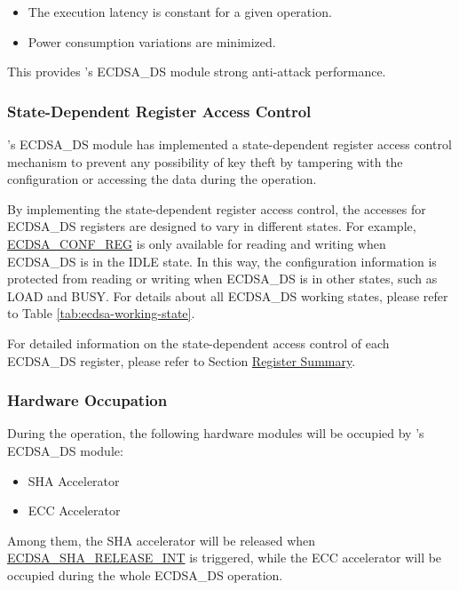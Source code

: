 \documentclass[main\_\_EN.tex]{subfiles}
\begin{document}
\begin{itemize}
    \item The execution latency is constant for a given operation.
    \item Power consumption variations are minimized.
\end{itemize}

This provides \chipseries{}'s ECDSA\_DS module strong anti-attack performance.

\subsubsection{State-Dependent Register Access Control}

\chipseries{}'s ECDSA\_DS module has implemented a state-dependent register access control mechanism to prevent any possibility of key theft by tampering with the configuration or accessing the data during the operation.

By implementing the state-dependent register access control, the accesses for ECDSA\_DS registers are designed to vary in different states. For example, \hyperref[regdesc:ECDSACONFREG]{ECDSA\_CONF\_REG} is only available for reading and writing when ECDSA\_DS is in the IDLE state. In this way, the configuration information is protected from reading or writing when ECDSA\_DS is in other states, such as LOAD and BUSY. For details about all ECDSA\_DS working states, please refer to Table \ref{tab:ecdsa-working-state}.

For detailed information on the state-dependent access control of each ECDSA\_DS register, please refer to Section \hyperref[sec:ecdsa-reg-summ]{Register Summary}.

\subsubsection{Hardware Occupation}

During the operation, the following hardware modules will be occupied by \chipname{}'s ECDSA\_DS module:
\begin{itemize}
    \item SHA Accelerator
    \item ECC Accelerator
\end{itemize}
Among them, the SHA accelerator will be released when \hyperref[int:ECDSASHARELEASEINT]{ECDSA\_SHA\_RELEASE\_INT} is triggered, while the ECC accelerator will be occupied during the whole ECDSA\_DS operation.
\end{document}
